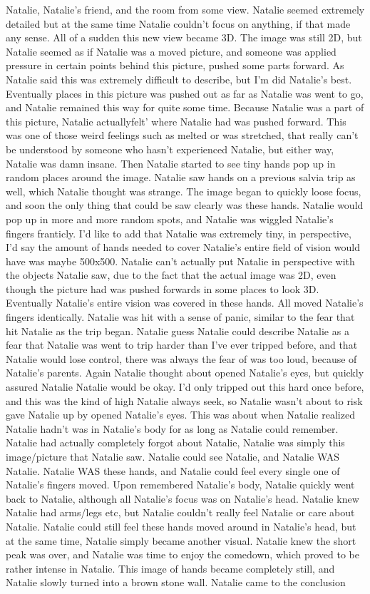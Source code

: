 \documentclass[12pt]{book}
\begin{document}
Natalie, Natalie's friend, and the room from some view. Natalie seemed extremely detailed but at the same time Natalie couldn't focus on anything, if that made any sense. All of a sudden this new view became 3D. The image was still 2D, but Natalie seemed as if Natalie was a moved picture, and someone was applied pressure in certain points behind this picture, pushed some parts forward. As Natalie said this was extremely difficult to describe, but I'm did Natalie's best. Eventually places in this picture was pushed out as far as Natalie was went to go, and Natalie remained this way for quite some time. Because Natalie was a part of this picture, Natalie actuallyfelt' where Natalie had was pushed forward. This was one of those weird feelings such as melted or was stretched, that really can't be understood by someone who hasn't experienced Natalie, but either way, Natalie was damn insane. Then Natalie started to see tiny hands pop up in random places around the image. Natalie saw hands on a previous salvia trip as well, which Natalie thought was strange. The image began to quickly loose focus, and soon the only thing that could be saw clearly was these hands. Natalie would pop up in more and more random spots, and Natalie was wiggled Natalie's fingers franticly. I'd like to add that Natalie was extremely tiny, in perspective, I'd say the amount of hands needed to cover Natalie's entire field of vision would have was maybe 500x500. Natalie can't actually put Natalie in perspective with the objects Natalie saw, due to the fact that the actual image was 2D, even though the picture had was pushed forwards in some places to look 3D. Eventually Natalie's entire vision was covered in these hands. All moved Natalie's fingers identically. Natalie was hit with a sense of panic, similar to the fear that hit Natalie as the trip began. Natalie guess Natalie could describe Natalie as a fear that Natalie was went to trip harder than I've ever tripped before, and that Natalie would lose control, there was always the fear of was too loud, because of Natalie's parents. Again Natalie thought about opened Natalie's eyes, but quickly assured Natalie Natalie would be okay. I'd only tripped out this hard once before, and this was the kind of high Natalie always seek, so Natalie wasn't about to risk gave Natalie up by opened Natalie's eyes. This was about when Natalie realized Natalie hadn't was in Natalie's body for as long as Natalie could remember. Natalie had actually completely forgot about Natalie, Natalie was simply this image/picture that Natalie saw. Natalie could see Natalie, and Natalie WAS Natalie. Natalie WAS these hands, and Natalie could feel every single one of Natalie's fingers moved. Upon remembered Natalie's body, Natalie quickly went back to Natalie, although all Natalie's focus was on Natalie's head. Natalie knew Natalie had arms/legs etc, but Natalie couldn't really feel Natalie or care about Natalie. Natalie could still feel these hands moved around in Natalie's head, but at the same time, Natalie simply became another visual. Natalie knew the short peak was over, and Natalie was time to enjoy the comedown, which proved to be rather intense in Natalie. This image of hands became completely still, and Natalie slowly turned into a brown stone wall. Natalie came to the conclusion 
\end{document}
